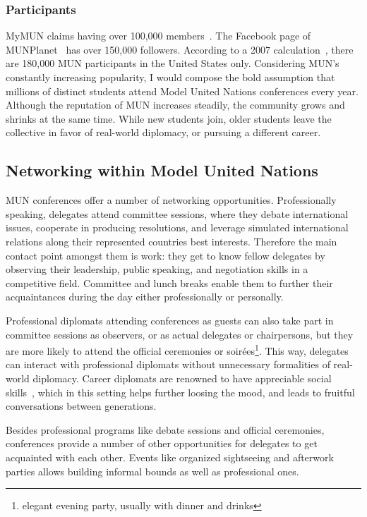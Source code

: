 \subsubsection{Participants}

MyMUN claims having over 100,000 members~\cite{mymunwebsite}. The Facebook page of MUNPlanet~\cite{munplanetfacebook} has over 150,000 followers. According to a 2007 calculation~\cite{howbigismun}, there are 180,000 MUN participants in the United States only. Considering MUN's constantly increasing popularity, I would compose the bold assumption that millions of distinct students attend Model United Nations conferences every year. Although the reputation of MUN increases steadily, the community grows and shrinks at the same time. While new students join, older students leave the collective in favor of real-world diplomacy, or pursuing a different career.

\subsection{Networking within Model United Nations}

MUN conferences offer a number of networking opportunities. Professionally speaking, delegates attend committee sessions, where they debate international issues, cooperate in producing resolutions, and leverage simulated international relations along their represented countries best interests. Therefore the main contact point amongst them is work: they get to know fellow delegates by observing their leadership, public speaking, and negotiation skills in a competitive field. Committee and lunch breaks enable them to further their acquaintances during the day either professionally or personally.

Professional diplomats attending conferences as guests can also take part in committee sessions as observers, or as actual delegates or chairpersons, but they are more likely to attend the official ceremonies or soirées\footnote{elegant evening party, usually with dinner and drinks}. This way, delegates can interact with professional diplomats without unnecessary formalities of real-world diplomacy. Career diplomats are renowned to have appreciable social skills~\cite{fsicapabilities}, which in this setting helps further loosing the mood, and leads to fruitful conversations between generations.

Besides professional programs like debate sessions and official ceremonies, conferences provide a number of other opportunities for delegates to get acquainted with each other. Events like organized sightseeing and afterwork parties allows building informal bounds as well as professional ones.

